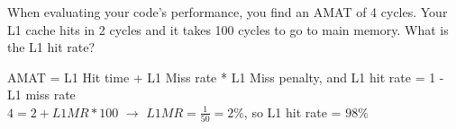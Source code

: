 \begin{blocksection}
\question
When evaluating your code’s performance, you find an AMAT of 4 cycles. Your L1 cache hits in 2 cycles and it takes 100 cycles to go to main memory. What is the L1 hit rate?

\begin{solution}[0.5in]
AMAT = L1 Hit time + L1 Miss rate * L1 Miss penalty, and L1 hit rate = 1 - L1 miss rate \\
$4 = 2 + L1MR * 100$ $\rightarrow$ $L1MR = \frac{1}{50} = 2\%$, so L1 hit rate = $98\%$

\end{solution}
\end{blocksection}